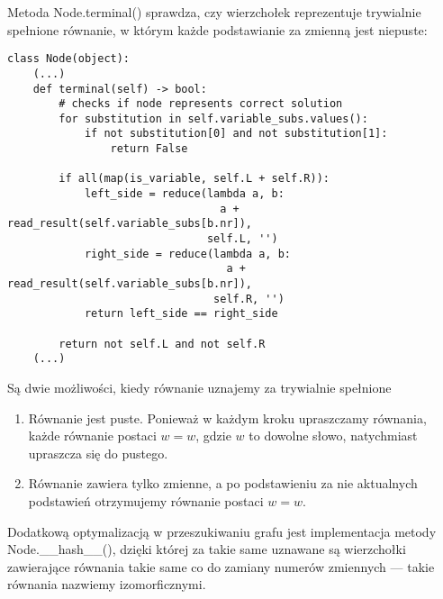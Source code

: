 \documentclass[leqno, 12pt]{article}
\begin{document}
\newpage
Metoda Node.terminal() sprawdza, czy wierzchołek reprezentuje trywialnie spełnione równanie, w którym każde podstawianie za zmienną jest niepuste:

\begin{verbatim}
class Node(object):
    (...)
    def terminal(self) -> bool:
        # checks if node represents correct solution
        for substitution in self.variable_subs.values():
            if not substitution[0] and not substitution[1]:
                return False

        if all(map(is_variable, self.L + self.R)):
            left_side = reduce(lambda a, b:
                                 a + read_result(self.variable_subs[b.nr]),
                               self.L, '')
            right_side = reduce(lambda a, b:
                                  a + read_result(self.variable_subs[b.nr]),
                                self.R, '')
            return left_side == right_side

        return not self.L and not self.R
    (...)
\end{verbatim}

Są dwie możliwości, kiedy równanie uznajemy za trywialnie spełnione

\begin{enumerate}
	\item Równanie jest puste. Ponieważ w każdym kroku upraszczamy równania, każde równanie postaci $w=w$, gdzie $w$ to dowolne słowo, natychmiast upraszcza się do pustego.

\item Równanie zawiera tylko zmienne, a po podstawieniu za nie aktualnych podstawień otrzymujemy równanie postaci $w=w$.
\end{enumerate}

Dodatkową optymalizacją w przeszukiwaniu grafu jest implementacja metody Node.\_\_hash\_\_(), dzięki której za takie same uznawane są wierzchołki zawierające równania takie same co do zamiany numerów zmiennych --- takie równania nazwiemy izomorficznymi.
\newpage
\end{document}
